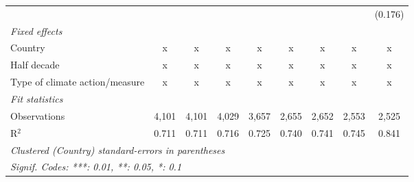 \begin{table}[htbp]
\begin{tabular}{lcccccccc}
                                                                                      &               &               &              &             &         &              &             & (0.176)\\   
      \emph{Fixed effects}\\
      Country                                                                         & x             & x             & x            & x           & x       & x            & x           & x\\  
      Half decade                                                                     & x             & x             & x            & x           & x       & x            & x           & x\\  
      Type of climate action/measure                                                  & x             & x             & x            & x           & x       & x            & x           & x\\  
      \midrule \emph{Fit statistics}\\
      Observations                                                                    & 4,101         & 4,101         & 4,029        & 3,657       & 2,655   & 2,652        & 2,553       & 2,525\\  
      R$^2$                                                                           & 0.711         & 0.711         & 0.716        & 0.725       & 0.740   & 0.741        & 0.745       & 0.841\\  
      \midrule
      \multicolumn{9}{l}{\emph{Clustered (Country) standard-errors in parentheses}}\\
      \multicolumn{9}{l}{\emph{Signif. Codes: ***: 0.01, **: 0.05, *: 0.1}}\\
   \end{tabular}
\end{table}


